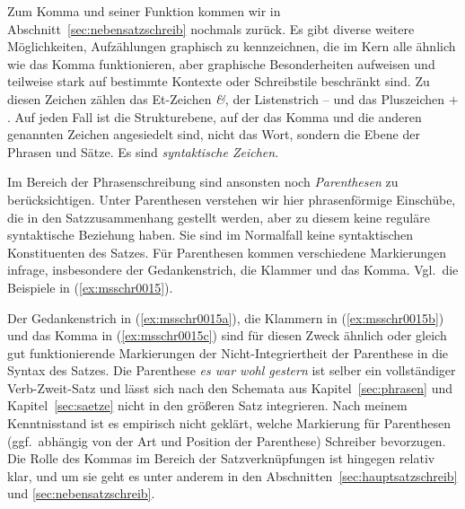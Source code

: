 \begin{exe}
\end{exe}

Zum Komma und seiner Funktion kommen wir in Abschnitt~\ref{sec:nebensatzschreib} nochmals zurück.
Es gibt diverse weitere Möglichkeiten, Aufzählungen graphisch zu kennzeichnen, die im Kern alle ähnlich wie das Komma funktionieren, aber graphische Besonderheiten aufweisen und teilweise stark auf bestimmte Kontexte oder Schreibstile beschränkt sind.
Zu diesen Zeichen zählen das Et-Zeichen \textit{\&}, der Listenstrich -- und das Pluszeichen $+$.
Auf jeden Fall ist die Strukturebene, auf der das Komma und die anderen genannten Zeichen angesiedelt sind, nicht das Wort, sondern die Ebene der Phrasen und Sätze.
Es sind \textit{syntaktische Zeichen}.


Im Bereich der Phrasenschreibung sind ansonsten noch \textit{Parenthesen} zu berücksichtigen.
Unter Parenthesen verstehen wir hier phrasenförmige Einschübe, die in den Satzzusammenhang gestellt werden, aber zu diesem keine reguläre syntaktische Beziehung haben.
Sie sind im Normalfall keine syntaktischen Konstituenten des Satzes.
Für Parenthesen kommen verschiedene Markierungen infrage, insbesondere der Gedankenstrich, die Klammer und das Komma.
Vgl.\ die Beispiele in (\ref{ex:msschr0015}).

\Enl

\begin{exe}
  \ex\label{ex:msschr0015} 
  \begin{xlist}
  \end{xlist}
\end{exe}

Der Gedankenstrich in (\ref{ex:msschr0015a}), die Klammern in (\ref{ex:msschr0015b}) und das Komma in (\ref{ex:msschr0015c}) sind für diesen Zweck ähnlich oder gleich gut funktionierende Markierungen der Nicht-Integriertheit der Parenthese in die Syntax des Satzes.
Die Parenthese \textit{es war wohl gestern} ist selber ein vollständiger Verb-Zweit-Satz und lässt sich nach den Schemata aus Kapitel~\ref{sec:phrasen} und Kapitel~\ref{sec:saetze} nicht in den größeren Satz integrieren.
Nach meinem Kenntnisstand ist es empirisch nicht geklärt, welche Markierung für Parenthesen (ggf.\ abhängig von der Art und Position der Parenthese) Schreiber bevorzugen.
Die Rolle des Kommas im Bereich der Satzverknüpfungen ist hingegen relativ klar, und um sie geht es unter anderem in den Abschnitten~\ref{sec:hauptsatzschreib} und \ref{sec:nebensatzschreib}.

